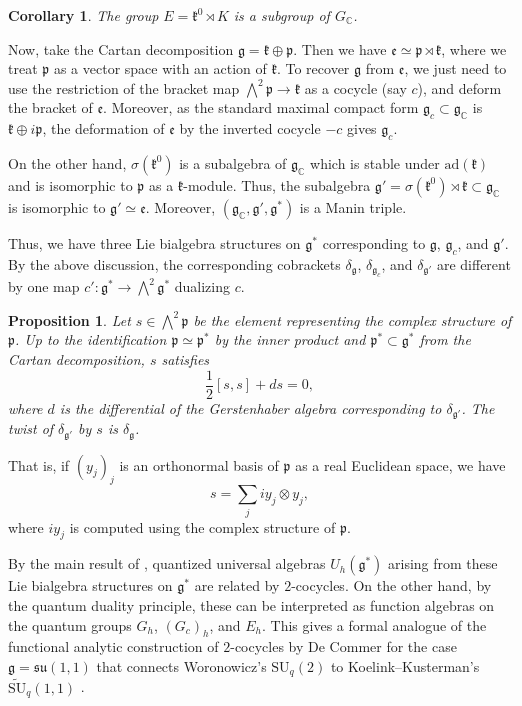 \documentclass[a4paper,11pt]{amsart}
\newcommand{\C}{\mathbb C}
\newcommand{\fr}[1]{\mathfrak{#1}}
\newcommand{\ad}{\mathrm{ad}}
\newcommand{\SU}{\mathrm{SU}}
\newcommand{\largewedge}{\bigwedge}
\newtheorem{prop}[thm]{Proposition}
\newtheorem{cor}[thm]{Corollary}
\theoremstyle{definition}
\theoremstyle{remark}
\begin{document}
\begin{cor}
The group $E = \fr k^0 \rtimes K$ is a subgroup of $G_\C$.
\end{cor}

Now, take the Cartan decomposition $\fr g = \fr k \oplus \fr p$.
Then we have $\fr e \simeq \fr p \rtimes \fr k$, where we treat $\fr p$ as a vector space with an action of $\fr k$.
To recover $\fr g$ from $\fr e$, we just need to use the restriction of the bracket map $\largewedge^2 \fr p \to \fr k$ as a cocycle (say $c$), and deform the bracket of $\fr e$.
Moreover, as the standard maximal compact form $\fr g_c \subset \fr g_\C$ is $\fr k \oplus i \fr p$, the deformation of $\fr e$ by the inverted cocycle $-c$ gives $\fr g_c$.

On the other hand, $\sigma(\fr k^0)$ is a subalgebra of $\fr g_\C$ which is stable under $\ad(\fr k)$ and is isomorphic to $\fr p$ as a $\fr k$-module.
Thus, the subalgebra $\fr g' = \sigma(\fr k^0) \rtimes \fr k \subset \fr g_\C$ is isomorphic to $\fr g' \simeq \fr e$.
Moreover, $(\fr g_\C, \fr g', \fr g^*)$ is a Manin triple.

Thus, we have three Lie bialgebra structures on $\fr g^*$ corresponding to $\fr g$, $\fr g_c$, and $\fr g'$.
By the above discussion, the corresponding cobrackets $\delta_{\fr g}$, $\delta_{\fr g_c}$, and $\delta_{\fr g'}$ are different by one map $c' \colon \fr g^* \to \largewedge^2 \fr g^*$ dualizing $c$.

\begin{prop}
Let $s \in \largewedge^2 \fr p$ be the element representing the complex structure of $\fr p$.
Up to the identification $\fr p \simeq \fr p^*$ by the inner product and $\fr p^* \subset \fr g^*$ from the Cartan decomposition, $s$ satisfies
\[
\frac12 [s, s] + d s = 0,
\]
where $d$ is the differential of the Gerstenhaber algebra corresponding to $\delta_{\fr g'}$.
The twist of $\delta_{\fr g'}$ by $s$ is $\delta_{\fr g}$.
\end{prop}

That is, if $(y_j)_j$ is an orthonormal basis of $\fr p$ as a real Euclidean space, we have
\[
s = \sum_j i y_j \otimes y_j,
\]
where $i y_j$ is computed using the complex structure of $\fr p$.

By the main result of \cite{MR2271019}, quantized universal algebras $U_h(\fr g^*)$ arising from these Lie bialgebra structures on $\fr g^*$ are related by $2$-cocycles.
On the other hand, by the quantum duality principle, these can be interpreted as function algebras on the quantum groups $G_h$, $(G_c)_h$, and $E_h$.
This gives a formal analogue of the functional analytic construction of $2$-cocycles by De Commer \cite{MR2793934} for the case $\fr g = \fr{su}(1, 1)$ that connects Woronowicz's $\SU_q(2)$ \cite{MR890482} to Koelink--Kusterman's $\widetilde{\SU}_q(1,1)$ \cite{MR1962042}.
\end{document}
